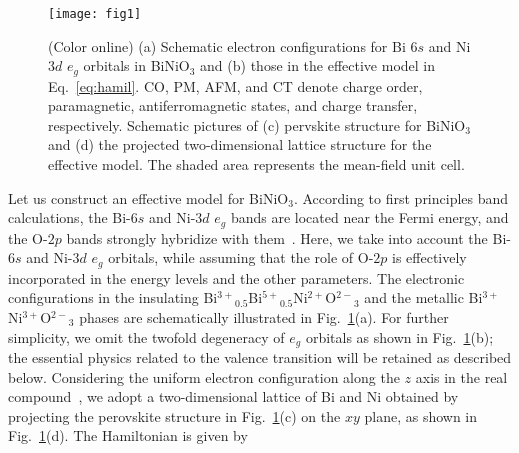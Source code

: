 \documentclass[aps,twocolumn,prl,showpacs,preprintnumbers,amsmath,amssymb]{revtex4}
\begin{document}
\begin{figure}[t]
\begin{center}
\texttt{[image: fig1]}
\end{center}
\caption{(Color online) 
(a) Schematic electron configurations for Bi $6s$ and Ni $3d$ $e_{g}$ orbitals in BiNiO$_3$ and (b) those in the effective model in Eq.~\ref{eq:hamil}. 
CO, PM, AFM, and CT denote charge order, paramagnetic, antiferromagnetic states, and charge transfer, respectively. 
Schematic pictures of (c) pervskite structure for BiNiO$_3$ and (d) the projected two-dimensional lattice structure for the effective model. 
The shaded area represents the mean-field unit cell. 
}
\label{fig:vst}
\end{figure}
%
%
%
Let us construct an effective model for BiNiO$_3$. 
According to first principles band calculations, the Bi-$6s$ and Ni-$3d$ $e_{g}$ bands are located near the Fermi energy, and the O-$2p$ bands strongly hybridize with them~\cite{Azuma_jacs}. 
Here, we take into account the Bi-$6s$ and Ni-$3d$ $e_{g}$ orbitals, while assuming that the role of O-$2p$ is effectively incorporated in the energy levels and the other parameters. 
The electronic configurations in the insulating Bi${^{3+}}_{0.5}$Bi${^{5+}}_{0.5}$Ni$^{2+}$O${^{2-}}_{3}$ and the metallic Bi$^{3+}$Ni$^{3+}$O${^{2-}}_{3}$ phases are schematically illustrated in Fig.~\ref{fig:vst}(a). 
For further simplicity, we omit the twofold degeneracy of $e_{g}$ orbitals as shown in Fig.~\ref{fig:vst}(b); the essential physics related to the valence transition will be retained as described below. 
Considering the uniform electron configuration along the $z$ axis in the real compound~\cite{Ishiwata_1}, we adopt a two-dimensional lattice of Bi and Ni obtained by projecting the perovskite structure in Fig.~\ref{fig:vst}(c) on the $xy$ plane, as shown in Fig.~\ref{fig:vst}(d). 
The Hamiltonian is given by 
\end{document}

